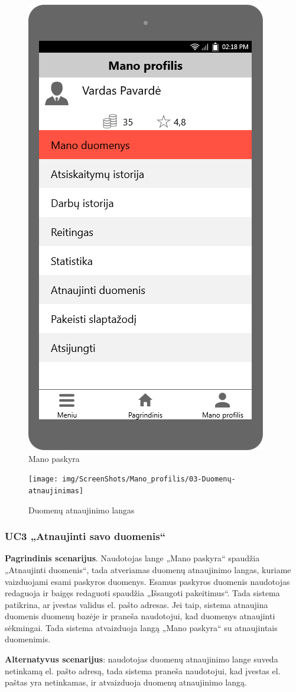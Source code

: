 \documentclass{VUMIFPSbakalaurinis}
\begin{document}
\begin{figure}[H]
	\centering
	\includegraphics[scale=0.4]{img/ScreenShots/Mano_profilis/00-Mano-profilis}
	\caption{Mano paskyra}
	\label{img:profile}
\end{figure}

\begin{figure}[H]
	\centering
	\texttt{[image: img/ScreenShots/Mano\_profilis/03-Duomenų-atnaujinimas]}
	\caption{Duomenų atnaujinimo langas}
	\label{img:update profile}
\end{figure}
\subsubsection{UC3 „Atnaujinti savo duomenis“}
\textbf{Pagrindinis scenarijus}. Naudotojas lange „Mano paskyra“ spaudžia „Atnaujinti duomenis“, tada atveriamas duomenų atnaujinimo langas, kuriame vaizduojami esami paskyros duomenys. Esamus paskyros duomenis naudotojas redaguoja ir baigęs redaguoti spaudžia „Išsaugoti pakeitimus“. Tada sistema patikrina, ar įvestas validus el. pašto adresas. Jei taip, sistema atnaujina duomenis duomenų bazėje ir praneša naudotojui, kad duomenys atnaujinti sėkmingai. Tada sistema atvaizduoja langą „Mano paskyra“ su atnaujintais duomenimis. 
\par\textbf{Alternatyvus scenarijus}: naudotojas duomenų atnaujinimo lange suveda netinkamą el. pašto adresą, tada sistema praneša naudotojui, kad įvestas el. paštas yra netinkamas, ir atvaizduoja duomenų atnaujinimo langą.
\end{document}
